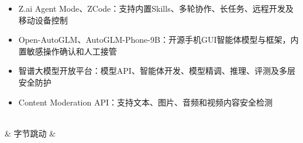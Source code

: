\begin{longtblr}[
  caption = {我国主流 AI 智能体安全产品与落地方向},
  label   = {tab:china-agent-security-products-verified-cited},
]
\begin{itemize}[leftmargin=*,topsep=0pt,partopsep=0pt,itemsep=1pt,parsep=0pt]
    \item Z.ai Agent Mode、ZCode：支持内置Skills、多轮协作、长任务、远程开发及移动设备控制
    \item Open-AutoGLM、AutoGLM-Phone-9B：开源手机GUI智能体模型与框架，内置敏感操作确认和人工接管\cite{zhipu_open_autoglm_2026}
    \item 智谱大模型开放平台：模型API、智能体开发、模型精调、推理、评测及多层安全防护\cite{zhipu_bigmodel_platform_2026}
    \item Content Moderation API：支持文本、图片、音频和视频内容安全检测\cite{zhipu_content_moderation_api_2026,zhipu_security_audit_2026}
  \end{itemize} \\
& 字节跳动
& \begin{itemize}[leftmargin=*,topsep=0pt,partopsep=0pt,itemsep=1pt,parsep=0pt]

\end{itemize}
\end{longtblr}
